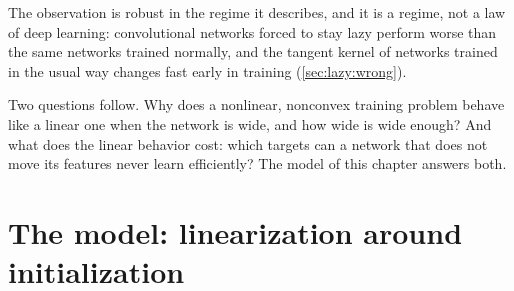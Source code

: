 \begin{refsection}
The observation is robust in the regime it describes, and it is a regime, not a law of deep learning: convolutional networks forced to stay lazy perform worse than the same networks trained normally, and the tangent kernel of networks trained in the usual way changes fast early in training (\cref{sec:lazy:wrong}).

Two questions follow. Why does a nonlinear, nonconvex training problem behave like a linear one when the network is wide, and how wide is wide enough? And what does the linear behavior cost: which targets can a network that does not move its features never learn efficiently? The model of this chapter answers both.

\section{The model: linearization around initialization}\label{sec:lazy:model}


\end{refsection}

